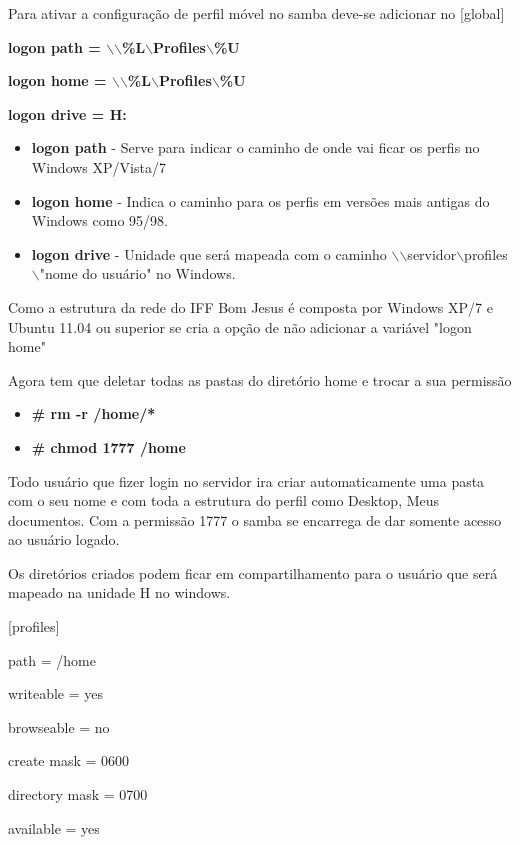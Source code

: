 Para ativar a configuração de perfil móvel no samba deve-se adicionar no [global] 

\textbf	{logon path = $\backslash$$\backslash$\%L$\backslash$Profiles$\backslash$\%U}

\textbf {logon home = $\backslash$$\backslash$\%L$\backslash$Profiles$\backslash$\%U}

\textbf	{logon drive = H:}

\begin{itemize}
	\item \textbf{logon path} - Serve para indicar o caminho de onde vai ficar os perfis no Windows XP/Vista/7 
	\item \textbf{logon home} - Indica o caminho para os perfis em versões mais antigas do Windows como 95/98.
	\item \textbf{logon drive} - Unidade que será mapeada com o caminho $\backslash$$\backslash$servidor$\backslash$profiles$\backslash$"nome do usuário" no Windows.
\end{itemize}

Como a estrutura da rede do IFF Bom Jesus é composta por Windows XP/7 e Ubuntu 11.04 ou superior se cria a opção de não adicionar a variável "logon home" 

Agora tem que deletar todas as pastas do diretório home e trocar a sua permissão 

\begin{itemize}
	\item \textbf{\# rm -r /home/*}
	\item \textbf{\# chmod 1777 /home}
\end{itemize}

Todo usuário que fizer login no servidor ira criar automaticamente uma pasta com o seu nome e com toda a estrutura do perfil como Desktop, Meus documentos. Com a permissão 1777 o samba se encarrega de dar somente acesso ao usuário logado.

Os diretórios criados podem ficar em compartilhamento para o usuário que será mapeado na unidade H no windows.

[profiles] 

	path = /home 
	
	writeable = yes 
	
	browseable = no 
	
	create mask = 0600 
	
	directory mask = 0700 
	
	available = yes 

